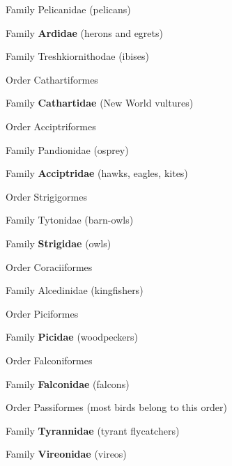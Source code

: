 \documentclass[10pt]{article}
\newlength\mylength
\newcommand*{\growparindent}{\addtolength{\parindent}{\mylength}}
\newcommand*{\reduceparindent}{\addtolength{\parindent}{-1\mylength}}
\begin{document}
\begin{multicols}{2}
\begin{spacing}{1.35}
      	Family Pelicanidae (pelicans)
      	
      	Family \textbf{Ardidae} (herons and egrets)
      	
      	Family Treshkiornithodae (ibises)
      	
      \reduceparindent
      
      Order Cathartiformes
      
      	\growparindent
      
      	Family \textbf{Cathartidae} (New World vultures)
      	
      \reduceparindent
      
      Order Acciptriformes
      
      	\growparindent
      	
      	Family Pandionidae (osprey)
      	
      	Family \textbf{Acciptridae} (hawks, eagles, kites)
      	
      \reduceparindent
      
      Order Strigigormes
      
      	\growparindent
      	
      	Family Tytonidae (barn-owls)
      	
      	Family \textbf{Strigidae} (owls)
      	
      \reduceparindent
      
      Order Coraciiformes
      
      	\growparindent
      	
      	Family Alcedinidae (kingfishers)
      	
      \reduceparindent
      
      Order Piciformes
      
      	\growparindent
      	
      	Family \textbf{Picidae} (woodpeckers)
      	
	  \reduceparindent
	  
	  Order Falconiformes
	  
	  	\growparindent
	  	
	  	Family \textbf{Falconidae} (falcons)
	  	
	  \reduceparindent
	  
	  Order Passiformes (most birds belong to this order)
	  
	  \growparindent
	  
	  	Family \textbf{Tyrannidae} (tyrant flycatchers)
	  	
	  	Family \textbf{Vireonidae} (vireos)
	  	

\end{spacing}
\end{multicols}
\end{document}
